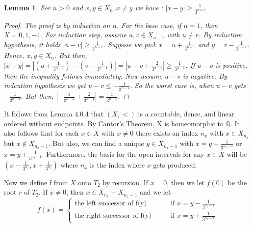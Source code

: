 \documentclass[12pt, a4paper]{scrartcl}
\newtheorem{lemma}[definition]{Lemma}
\begin{document}
\begin{lemma}
    For $n>0$ and $x,y \in X_n, x \neq y$ we have : $\left| x - y \right| \geq \frac{1}{3^{n-1}}$

    \begin{proof}
        The proof is by induction on $n$. For the base case, if $n=1$, then $X = {0,1,-1}$. For induction step, assume $u,v \in X_{n-1}$ with $u \neq v$. By induction hypothesis, it holds 
        $|u-v| \geq \frac{1}{3^{n-2}}$. Suppose we pick $x = u + \frac{1}{3^{n-1}}$ and $y = v - \frac{1}{3^{n-1}}$. Hence, $x,y \in X_n$. But then, $|x - y| = \left| (u + \frac{1}{3^{n-1}}) - (v - \frac{1}{3^{n-1}})\right| = \left| u - v + \frac{2}{3^{n-1}} \right| \geq \frac{1}{3^{n-1}}$. If $u-v$ is positive, 
        then the inequality follows immediately. Now assume $u-v$ is negative. By indcution hypothesis we get $u-v \leq -\frac{1}{3^{n-2}}$. So the worst case is, when $u-v$ gets $-\frac{1}{3^{n-2}}$.
        But then, $\left| -\frac{1}{3^{n-2}} + \frac{2}{3^{n-1}} \right| = \frac{1}{3^{n-1}}$.
    \end{proof}
\end{lemma}


It follows from Lemma 4.0.4 that $(X, <)$ is a countable, dense, and linear ordered without endpoints. By Cantor's Theorem, X is homeomorphic to $\mathbb{Q}$.
It also follows that for each $x \in X$ with $x \neq 0$ there exists an index $n_x$ with $x \in X_{n_x}$ but $x \notin X_{n_{x}-1}$. But also, we can find a unique $y \in X_{{n_x}-1}$ with $x = y - \frac{1}{3^{n_x -1}}$ or $x = y + \frac{1}{3^{n_x -1}}$.
Furthermore, the basis for the open intervals for any $x \in X$ will be $(x- \frac{1}{3^{n_x}}, x + \frac{1}{3^{n_x}})$ where $n_x$ is the index where $x$ gets produced. \newline

Now we define f from $X$ onto $T_2$ by recursion. If $x = 0$, then we let $f(0)$ be the root $r$ of $T_2$. If $x \neq 0$, then 
$x \in X_{n_x} - X_{n_x -1}$ and we let 
\[
            f(x) = 
            \begin{cases}
                \mbox{the left successor of f(y)} \qquad &\mbox{if } x = y - \frac{1}{3^{n_x -1}} \\
                \mbox{the right successor of f(y)} \qquad & \mbox{if } x = y + \frac{1}{3^{n_x -1}}
            \end{cases}
\]
\end{document}

